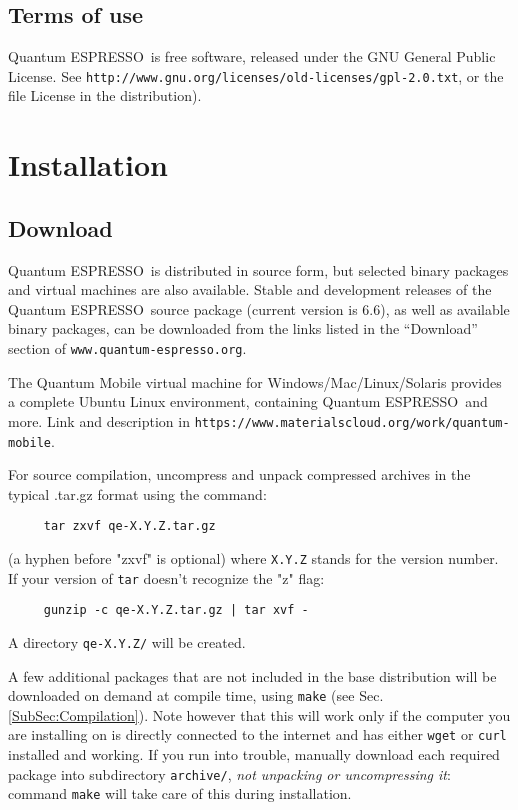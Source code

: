 \documentclass[12pt,a4paper]{article}
\def\version{6.6}
\def\qe{{\sc Quantum ESPRESSO}}
\begin{document}
\subsection{Terms of use}
\label{SubSec:Terms}

\qe\ is free software, released under the
GNU General Public License. See
\texttt{http://www.gnu.org/licenses/old-licenses/gpl-2.0.txt},
or the file License in the distribution).


\section{Installation}

\subsection{Download}
\label{SubSec:Download}

\qe\ is distributed in source form, but selected binary packages
and virtual machines are also available.
Stable and development releases of the \qe\ source package
(current version is \version), as well as available binary
packages, can be downloaded from the links listed in the
``Download'' section of \texttt{www.quantum-espresso.org}.

The Quantum Mobile virtual machine for Windows/Mac/Linux/Solaris
provides a complete Ubuntu Linux environment, containing \qe\ and
more. Link and description in
\texttt{https://www.materialscloud.org/work/quantum-mobile}.

For source compilation, uncompress and unpack compressed archives
in the typical .tar.gz format using the command:
\begin{verbatim}
     tar zxvf qe-X.Y.Z.tar.gz
\end{verbatim}
(a hyphen before "zxvf" is optional) where \texttt{X.Y.Z} stands for the
version number. If your version of \texttt{tar}
doesn't recognize the "z" flag:
\begin{verbatim}
     gunzip -c qe-X.Y.Z.tar.gz | tar xvf -
\end{verbatim}
A directory \texttt{qe-X.Y.Z/} will be created.

A few additional packages that are not included in the base distribution
will be downloaded on demand at compile time, using \texttt{make}
(see Sec.\ref{SubSec:Compilation}).
Note however that this will work only if the computer you are
installing on is directly connected to the internet and has
either \texttt{wget} or \texttt{curl} installed and working.
If you run into trouble, manually download each required package
into subdirectory \texttt{archive/}, {\em not unpacking or
uncompressing it}:
command \texttt{make} will take care of this during installation.
\end{document}
